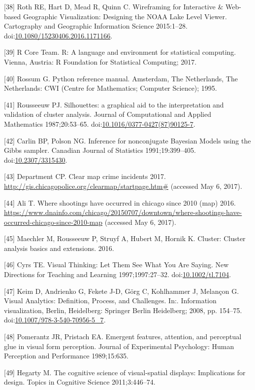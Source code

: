 \documentclass[]{article}
\begin{document}
\hypertarget{ref-Roth:2015ts}{}
{[}38{]} Roth RE, Hart D, Mead R, Quinn C. Wireframing for Interactive
\& Web-based Geographic Visualization: Designing the NOAA Lake Level
Viewer. Cartography and Geographic Information Science 2015:1--28.
doi:\href{https://doi.org/10.1080/15230406.2016.1171166}{10.1080/15230406.2016.1171166}.

\hypertarget{ref-RSoftware}{}
{[}39{]} R Core Team. R: A language and environment for statistical
computing. Vienna, Austria: R Foundation for Statistical Computing;
2017.

\hypertarget{ref-Rossum:1995:PRM:869369}{}
{[}40{]} Rossum G. Python reference manual. Amsterdam, The Netherlands,
The Netherlands: CWI (Centre for Mathematics; Computer Science); 1995.

\hypertarget{ref-Rousseeuw:1987gv}{}
{[}41{]} Rousseeuw PJ. Silhouettes: a graphical aid to the
interpretation and validation of cluster analysis. Journal of
Computational and Applied Mathematics 1987;20:53--65.
doi:\href{https://doi.org/10.1016/0377-0427(87)90125-7}{10.1016/0377-0427(87)90125-7}.

\hypertarget{ref-Carlin:1991cl}{}
{[}42{]} Carlin BP, Polson NG. Inference for nonconjugate Bayesian
Models using the Gibbs sampler. Canadian Journal of Statistics
1991;19:399--405.
doi:\href{https://doi.org/10.2307/3315430}{10.2307/3315430}.

\hypertarget{ref-chicagoPoliceMap}{}
{[}43{]} Department CP. Clear map crime incidents 2017.
\url{http://gis.chicagopolice.org/clearmap/startpage.htm\#} (accessed
May 6, 2017).

\hypertarget{ref-chicagoShootingsMap}{}
{[}44{]} Ali T. Where shootings have occurred in chicago since 2010
(map) 2016.
\url{https://www.dnainfo.com/chicago/20150707/downtown/where-shootings-have-occurred-chicago-since-2010-map}
(accessed May 6, 2017).

\hypertarget{ref-clusterR}{}
{[}45{]} Maechler M, Rousseeuw P, Struyf A, Hubert M, Hornik K. Cluster:
Cluster analysis basics and extensions. 2016.

\hypertarget{ref-Cyrs:1997gz}{}
{[}46{]} Cyrs TE. Visual Thinking: Let Them See What You Are Saying. New
Directions for Teaching and Learning 1997;1997:27--32.
doi:\href{https://doi.org/10.1002/tl.7104}{10.1002/tl.7104}.

\hypertarget{ref-Keim:2008gg}{}
{[}47{]} Keim D, Andrienko G, Fekete J-D, Görg C, Kohlhammer J, Melançon
G. Visual Analytics: Definition, Process, and Challenges. In:.
Information visualization, Berlin, Heidelberg: Springer Berlin
Heidelberg; 2008, pp. 154--75.
doi:\href{https://doi.org/10.1007/978-3-540-70956-5_7}{10.1007/978-3-540-70956-5\_7}.

\hypertarget{ref-pomerantz1989emergent}{}
{[}48{]} Pomerantz JR, Pristach EA. Emergent features, attention, and
perceptual glue in visual form perception. Journal of Experimental
Psychology: Human Perception and Performance 1989;15:635.

\hypertarget{ref-hegarty2011cognitive}{}
{[}49{]} Hegarty M. The cognitive science of visual-spatial displays:
Implications for design. Topics in Cognitive Science 2011;3:446--74.
\end{document}
